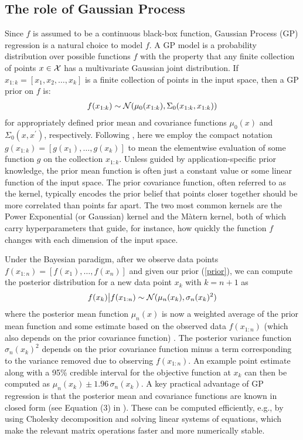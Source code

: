 \subsection{The role of Gaussian Process}

Since $f$ is assumed to be a continuous black-box function, Gaussian Process (GP) regression is a natural choice to model $f$. A GP model is a probability distribution over possible functions $f$ with the property that any finite collection of points $x\in\mathcal{X}$ has a multivariate Gaussian joint distribution. If $x_{1:k}=[x_1, x_2, \dots, x_k]$ is a finite collection of points in the input space, then a GP prior on $f$ is:
\begin{align}
    f(x_{1:k}) \sim \mathcal{N}(\mu_0(x_{1:k}), \Sigma_0(x_{1:k}, x_{1:k}))\label{prior}
\end{align}
for appropriately defined prior mean and covariance functions $\mu_0(x)$ and $\Sigma_0(x, x^\prime)$, respectively. Following , here we employ the compact notation $g(x_{1:k})=[g(x_1), \dots, g(x_k)]$ to mean the elementwise evaluation of some function $g$ on the collection $x_{1:k}$. Unless guided by application-specific prior knowledge, the prior mean function is often just a constant value or some linear function of the input space. The prior covariance function, often referred to as the kernel, typically encodes the prior belief that points closer together should be more correlated than points far apart. The two most common kernels are the Power Exponential (or Gaussian) kernel and the M\`{a}tern kernel, both of which carry hyperparameters that guide, for instance, how quickly the function $f$ changes with each dimension of the input space.

Under the Bayesian paradigm, after we observe data points $f(x_{1:n})=[f(x_1), \dots, f(x_n)]$ and given our prior (\ref{prior}), we can compute the posterior distribution for a new data point $x_k$ with $k=n+1$ as
\begin{align}
    f(x_k)\big\vert f(x_{1:n}) \sim \mathcal{N}(\mu_n(x_{k}), \sigma_n(x_{k})^2)\label{posterior}
\end{align}
where the posterior mean function $\mu_n(x)$ is now a weighted average of the prior mean function and some estimate based on the observed data $f(x_{1:n})$ (which also depends on the prior covariance function) \cite{Frazier2018}. The posterior variance function $\sigma_n(x_{k})^2$ depends on the prior covariance function minus a term corresponding to the variance removed due to observing $f(x_{1:n})$. An example point estimate along with a 95\% credible interval for the objective function at $x_k$ can then be computed as $\mu_n(x_k) \pm 1.96\, \sigma_n(x_k)$. A key practical advantage of GP regression is that the posterior mean and covariance functions are known in closed form (see Equation (3) in ). These can be computed efficiently, e.g., by using Cholesky decomposition and solving linear systems of equations, which make the relevant matrix operations faster and more numerically stable.  

